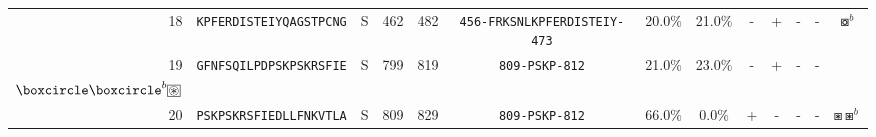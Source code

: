 \begin{tabular}{rcccccccccccc}
18 &  \texttt{KPFERDISTEIYQAGSTPCNG} &       S &    462 &   482 &  \texttt{{\scriptsize 456-}FRKSNLKPFERDISTEIY{\scriptsize -473}} &                          20.0\% &                           21.0\% &          - &           + &          - &           - &                                                                                                                                            $ \boxcircle^b $ \\
19 &  \texttt{GFNFSQILPDPSKPSKRSFIE} &       S &    799 &   819 &                \texttt{{\scriptsize 809-}PSKP{\scriptsize -812}} &                          21.0\% &                           23.0\% &          - &           + &          - &           - &           \Centerstack{  $\boxempty \boxempty^b \boxempty^d \boxempty^{bd}$ \\  $\boxcircle \boxcircle^b \setlength{\fboxsep}{0.5pt} \boxed{\circledast}$ } \\
20 &  \texttt{PSKPSKRSFIEDLLFNKVTLA} &       S &    809 &   829 &                \texttt{{\scriptsize 809-}PSKP{\scriptsize -812}} &                          66.0\% &                            0.0\% &          + &           - &          - &           - &                                                                                                                                       $ \boxast \boxast^b $ \\
\bottomrule
\end{tabular}
